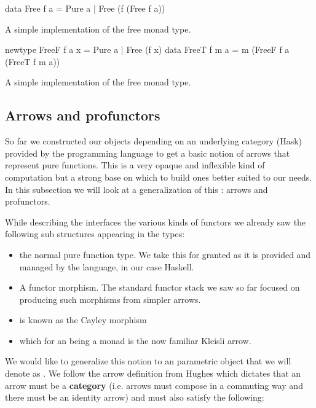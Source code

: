 \begin{code}
\begin{haskellcode}
data Free f a
  = Pure a
  | Free (f (Free f a))
\end{haskellcode}
  \caption{\label{lst:free_def_naive}A simple implementation of the free
    monad type.}
\end{code}

\begin{code}
\begin{haskellcode}
newtype FreeF f a x = Pure a | Free (f x)
data FreeT f m a = m (FreeF f a (FreeT f m a))
\end{haskellcode}
  \caption{\label{lst:free_def}A simple implementation of the free
    monad type.}
\end{code}

\subsection{Arrows and profunctors}

So far we constructed our objects depending on an underlying category
(Hask) provided by the programming language to get a basic notion of
arrows that represent pure functions. This is a very opaque and
inflexible kind of computation but a strong base on which to build
ones better suited to our needs. In this subsection we will look at a
generalization of this : arrows and profunctors.

While describing the interfaces the various kinds of functors we
already saw the following sub structures appearing in the types:

\begin{itemize}
\item {} the normal pure function type. We take this for granted as
it is provided and managed by the language, in our case Haskell.
\item {} A functor morphism. The standard functor stack we saw
so far focused on producing such morphisms from simpler arrows.
\item {} is known as the Cayley morphism
\item {} which for an  being a monad is the now familiar
Kleisli arrow.
\end{itemize}

We would like to generalize this notion to an parametric object that
we will denote as \hask{~>}. We follow the arrow definition from
Hughes \cite{hughesProgrammingArrows2005} which dictates that an arrow
must be a \textbf{category} (i.e. arrows must compose in a commuting
way and there must be an identity arrow) and must also satisfy the
following:

